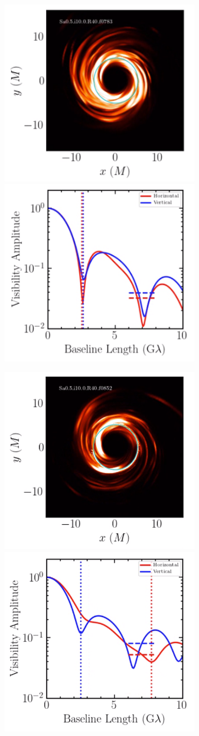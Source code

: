 \documentclass[twocolumn,tighten,dvipsnames,linenumbers]{aastex63}
\begin{document}
\begin{figure}
 \centerline{
    \includegraphics[width=8.5cm] {783_image}
     \includegraphics[width=8.5cm] {783_va}}
 \centerline{
    \includegraphics[width=8.5cm] {852_image}
    \includegraphics[width=8.5cm] {852_va}}

\end{figure}
\end{document}
